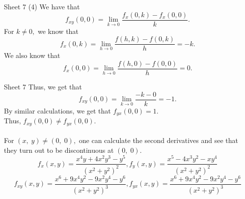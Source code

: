 \documentclass[handout]{beamer}
\begin{document}
\begin{frame}{Sheet 7}
	(4) We have that
	\[f_{x y}(0,0)=\lim _{k \rightarrow 0} \frac{f_{x}(0, k)-f_{x}(0,0)}{k}.\]
	For $k \neq 0,$ we know that
	\[f_{x}(0, k)=\lim _{h \rightarrow 0} \frac{f(h, k)-f(0, k)}{h}=-k.\]
	We also know that 
	\[f_{x}(0,0)=\lim _{h \rightarrow 0} \frac{f(h, 0)-f(0,0)}{h}=0.\]
\end{frame}

\begin{frame}{Sheet 7}
	Thus, we get that
	\[f_{x y}(0,0)=\lim _{k \rightarrow 0} \frac{-k-0}{k}=-1.\]
	By similar calculations, we get that $f_{y x}(0,0)=1.$\\
	Thus, $f_{x y}(0,0) \neq f_{y x}(0,0).$\\~\\
	For $(x,\;y) \neq (0,\;0),$ one can calculate the second derivatives and see that they turn out to be discontinuous at $(0,\;0).$
	\[{f_{x}(x, y)=\frac{x^{4} y+4 x^{2} y^{3}-y^{5}}{\left(x^{2}+y^{2}\right)^{2}}, f_{y}(x, y)=\frac{x^{5}-4 x^{3} y^{2}-x y^{4}}{\left(x^{2}+y^{2}\right)^{2}}} \]
	\[ {f_{xy}(x,y)=\frac{x^{6}+9 x^{4} y^{2}-9 x^{2} y^{4}-y^{6}}{\left(x^{2}+y^{2}\right)^{3}},f_{yx}(x, y)=\frac{x^{6}+9 x^{4} y^{2}-9 x^{2} y^{4}-y^{6}}{\left(x^{2}+y^{2}\right)^{3}}}\]
\end{frame}
\end{document}
